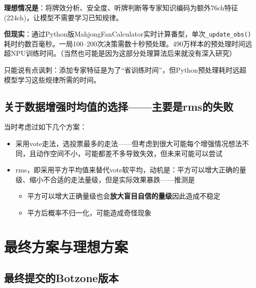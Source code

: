 \documentclass{article}
\begin{document}
\textbf{理想情况是}：将牌效分析、安全度、听牌判断等专家知识编码为额外76ch特征(224ch)，让模型不需要学习已知规律。

\textbf{但现实}：通过Python版MahjongFanCalculator实时计算番型，单次\texttt{\_update\_obs()}耗时约数百毫秒。一局100--200次决策需数十秒预处理。490万样本的预处理时间远超NPU训练时间。（当然也可能是因为这部分处理算法后来就没有深入研究）

只能说有点讽刺：添加专家特征是为了``省训练时间''，但Python预处理耗时远超模型学习这些规律所需的时间。

\subsection{关于数据增强时均值的选择——主要是rms的失败}

当时考虑过如下几个方案：

\begin{itemize}
  \item 采用vote走法，选投票最多的走法——但考虑到很大可能每个增强情况想法不同，且动作空间不小，可能都差不多导致失效，但未来可能可以尝试
  \item rms，即采用平方平均值来替代vote软平均，动机是：平方可以增大正确的量级、缩小不合适的走法量级，但是实际效果暴跌——推测是
  \begin{itemize}
    \item 平方可以增大正确量级也会\textbf{放大盲目自信的量级}因此造成不稳定
    \item 平方后概率不归一化，可能造成奇怪现象
  \end{itemize}
\end{itemize}

\section{最终方案与理想方案}

\subsection{最终提交的Botzone版本}
\end{document}
